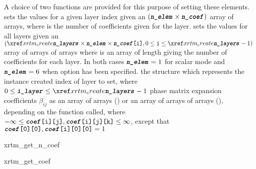 {A choice of two functions are provided for this purpose of setting these elements.   sets the values for a given layer index  given an $(\texttt{\textit{\textbf{n\_elem}}} \times \texttt{\textit{\textbf{n\_coef}}})$ array of arrays, where  is the number of coefficients given for the layer.   sets the values for all layers given an $(\createarg{n\_layers} \times \sourcenamearg{n\_elem} \times \sourcenameargarray{n\_coef}{[i]}, 0 \le \source{i} \le \createarg{n\_layers} - 1)$ array of arrays of arrays where  is an array of length  giving the number of coefficients for each layer.  In both cases $\texttt{\textit{\textbf{n\_elem}}} = 1$ for scalar mode and $\texttt{\textit{\textbf{n\_elem}}} = 6$ when option  has been specified.
}{
             {the  structure which represents the instance created}
      {index of layer to set, where $0 \le \sourcenamearg{i\_layer} \le \createarg{n\_layers} - 1$}
          {phase matrix expansion coefficients $\beta_{ij}$ as an array of arrays () or an array of arrays of arrays (), depending on the function called, where $-\infty \le \texttt{\textit{\textbf{coef}}[i][j]},\texttt{\textit{\textbf{coef}}[i][j][k]} \le \infty$, except that $\texttt{\textit{\textbf{coef}}[0][0]},\texttt{\textit{\textbf{coef}}[i][0][0]} = 1$}
}{
\interrornoret
}


\begin{prototype}{xrtm_get_n_coef}
\end{prototype}



\begin{prototype}{xrtm_get_coef}
\end{prototype}

